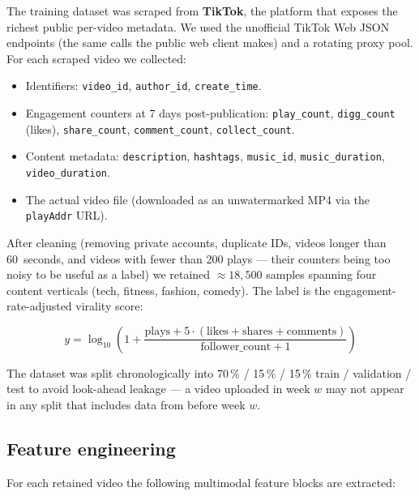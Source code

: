The training dataset was scraped from \textbf{TikTok}, the platform that exposes the richest
public per-video metadata. We used the unofficial TikTok Web JSON endpoints (the same calls
the public web client makes) and a rotating proxy pool. For each scraped video we collected:

\begin{itemize}
  \item Identifiers: \texttt{video\_id}, \texttt{author\_id}, \texttt{create\_time}.
  \item Engagement counters at 7 days post-publication:
        \texttt{play\_count}, \texttt{digg\_count} (likes), \texttt{share\_count},
        \texttt{comment\_count}, \texttt{collect\_count}.
  \item Content metadata: \texttt{description}, \texttt{hashtags}, \texttt{music\_id},
        \texttt{music\_duration}, \texttt{video\_duration}.
  \item The actual video file (downloaded as an unwatermarked MP4 via the
        \texttt{playAddr} URL).
\end{itemize}

After cleaning (removing private accounts, duplicate IDs, videos longer than 60~seconds, and
videos with fewer than 200 plays --- their counters being too noisy to be useful as a label)
we retained \textbf{$\approx 18{,}500$} samples spanning four content verticals (tech,
fitness, fashion, comedy). The label is the engagement-rate-adjusted virality score:

\begin{equation}
  y = \log_{10}\!\left(1 + \frac{\text{plays} + 5\cdot(\text{likes} + \text{shares} + \text{comments})}{\text{follower\_count}+1}\right)
  \label{eq:label}
\end{equation}

The dataset was split chronologically into 70\,\% / 15\,\% / 15\,\% train / validation / test
to avoid look-ahead leakage --- a video uploaded in week $w$ may not appear in any split that
includes data from before week $w$.

\subsection{Feature engineering}
\label{sec:fe}

For each retained video the following multimodal feature blocks are extracted:

